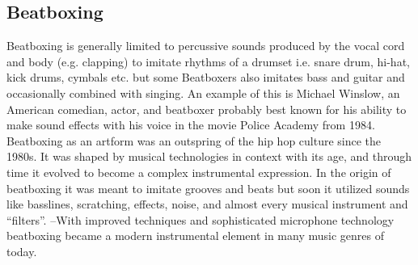 \subsection{ Beatboxing }
Beatboxing is generally limited to percussive sounds produced by the vocal cord and body (e.g. clapping) to imitate rhythms of a drumset i.e. snare drum, hi-hat, kick drums, cymbals etc. but some Beatboxers also imitates bass and guitar and occasionally combined with singing. An example of this is Michael Winslow, an American comedian, actor, and beatboxer probably best known for his ability to make sound effects with his voice in the movie Police Academy from 1984. Beatboxing as an artform was an outspring of the hip hop culture since the 1980s. It was shaped by musical technologies in context with its age, and through time it evolved to become a complex instrumental expression. In the origin of beatboxing it was meant to imitate grooves and beats but soon it utilized sounds like basslines, scratching, effects, noise, and almost every musical instrument and “filters”. –With improved techniques and sophisticated microphone technology beatboxing became a modern instrumental element in many music genres of today.

